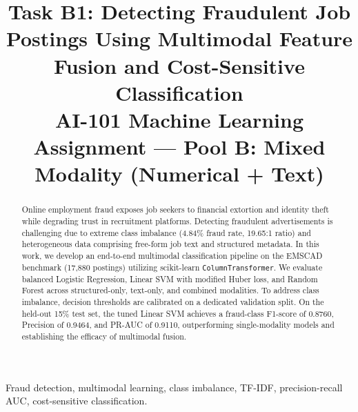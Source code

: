 \documentclass[conference]{IEEEtran}
\begin{document}
\title{Task B1: Detecting Fraudulent Job Postings Using Multimodal Feature Fusion and Cost-Sensitive Classification\\
\large AI-101 Machine Learning Assignment --- Pool B: Mixed Modality (Numerical + Text)}

\author{
\and
{}
}

\maketitle

\begin{abstract}
Online employment fraud exposes job seekers to financial extortion and identity theft while degrading trust in recruitment platforms. Detecting fraudulent advertisements is challenging due to extreme class imbalance (4.84\% fraud rate, 19.65:1 ratio) and heterogeneous data comprising free-form job text and structured metadata. In this work, we develop an end-to-end multimodal classification pipeline on the EMSCAD benchmark (17,880 postings) utilizing scikit-learn \texttt{ColumnTransformer}. We evaluate balanced Logistic Regression, Linear SVM with modified Huber loss, and Random Forest across structured-only, text-only, and combined modalities. To address class imbalance, decision thresholds are calibrated on a dedicated validation split. On the held-out 15\% test set, the tuned Linear SVM achieves a fraud-class F1-score of 0.8760, Precision of 0.9464, and PR-AUC of 0.9110, outperforming single-modality models and establishing the efficacy of multimodal fusion.
\end{abstract}

\begin{IEEEkeywords}
Fraud detection, multimodal learning, class imbalance, TF-IDF, precision-recall AUC, cost-sensitive classification.
\end{IEEEkeywords}
\end{document}
